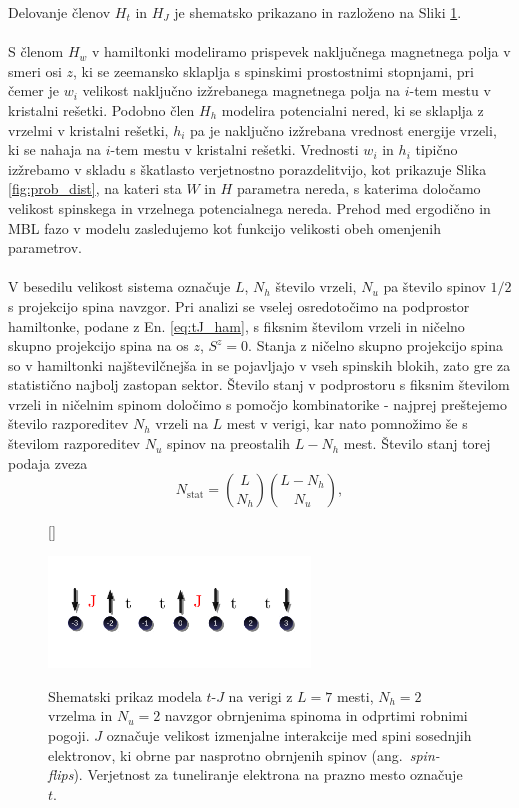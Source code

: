 Delovanje členov $H_t$ in $H_J$ je shematsko prikazano in razloženo na Sliki \ref{fig:tJ_scheme}. \\\\
S členom $H_w$ v hamiltonki modeliramo prispevek naključnega magnetnega polja v smeri osi $z$, ki se zeemansko sklaplja s 
spinskimi prostostnimi stopnjami, pri čemer je $w_i$ velikost naključno izžrebanega magnetnega polja na $i$-tem mestu v kristalni rešetki. Podobno člen $H_h$ modelira potencialni nered, ki se sklaplja z vrzelmi v kristalni rešetki, $h_i$ pa je naključno izžrebana vrednost energije vrzeli, ki se nahaja na $i$-tem mestu v kristalni rešetki. Vrednosti $w_i$ in $h_i$ tipično izžrebamo v skladu s škatlasto verjetnostno porazdelitvijo, kot prikazuje Slika \ref{fig:prob_dist}, na kateri sta $W$ in $H$	 parametra 
nereda, s katerima določamo velikost spinskega in vrzelnega potencialnega nereda. Prehod med ergodično in MBL fazo
v modelu zasledujemo kot funkcijo velikosti obeh omenjenih parametrov.\\\\
V besedilu velikost sistema označuje $L$, $N_h$ število vrzeli, $N_u$ pa število spinov $1/2$ s projekcijo spina navzgor. Pri analizi se vselej osredotočimo na podprostor hamiltonke, podane z En. \eqref{eq:tJ_ham}, s fiksnim številom vrzeli in ničelno skupno projekcijo spina na os $z$, $S^z=0$. Stanja z ničelno skupno projekcijo spina so v hamiltonki najštevilčnejša in se pojavljajo v vseh spinskih blokih, zato gre za statistično najbolj zastopan sektor. Število stanj v podprostoru s fiksnim številom vrzeli in ničelnim spinom določimo s pomočjo kombinatorike - najprej prešteje{}mo število razporeditev $N_h$ vrzeli na $L$ mest v verigi, kar nato pomnožimo še s številom razporeditev $N_u$ spinov na preostalih $L-N_h$ mest. Število stanj torej podaja zveza
\begin{equation}\label{eq:nstat}
N_\mathrm{stat}=\binom{L}{N_h}\binom{L-N_h}{N_u},
\end{equation}
\begin{figure}[H]
[\FBwidth]
{\caption{Shematski prikaz modela $t$-$J$ na verigi z $L=7$ mesti, $N_h=2$ vrzelma in $N_u=2$ navzgor obrnjenima spinoma in odprtimi robnimi pogoji.	 $J$ označuje velikost izmenjalne interakcije med spini sosednjih elektronov, ki obrne par nasprotno obrnjenih spinov (ang.~\emph{spin-flips}). Verjetnost za tuneliranje elektrona na prazno mesto označuje $t$. }\label{fig:tJ_scheme}}
{\includegraphics[width=0.62\textwidth]{tJ_scheme.pdf}}
\end{figure}
